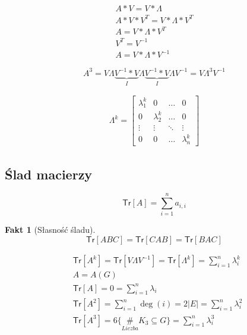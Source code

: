 \documentclass[a4paper,12pt]{article}
\theoremstyle{definition}%
\newtheorem*{fact*}{Fakt} %
\theoremstyle{definition}
\theoremstyle{problem}
\begin{document}
\begin{align*}
A*V=V*\Lambda \\
A*V*V^T=V*\Lambda *V^T\\
A=V*\Lambda *V^T\\
V^T=V^{-1}\\
A= V*\Lambda *V^{-1}
\end{align*}

$$A^3=V\Lambda \underbrace{V^{-1} * V}_I\Lambda \underbrace{V^{-1}* V}_I\Lambda V^{-1} = V\Lambda ^3V^{-1}$$

\begin{align*}
\Lambda ^k= \begin{bmatrix}
\lambda _1^k& 0 & \dots & 0\\
0 & \lambda _2^k & \dots & 0\\
\vdots & \vdots &\ddots & \vdots \\
0 & 0 & \dots & \lambda _n^k
\end{bmatrix}
\end{align*}

\subsection{Ślad macierzy}
$$\mathsf{Tr}[A]=\sum_{i=1}^n a_{i,i}$$
\begin{fact*}[Słasność śladu]
$$\mathsf{Tr}[ABC]=\mathsf{Tr}[CAB]=\mathsf{Tr}[BAC]$$
\end{fact*}
\begin{align*}
&\mathsf{Tr}[A^k]=\mathsf{Tr}[V \Lambda V^{-1}]=\mathsf{Tr}[\Lambda ^k]=\sum_{i=1}^n\lambda_i^k\\
&A=A(G)\\
&\mathsf{Tr}[A]=0=\sum_{i=1}^n\lambda _i\\
&\mathsf{Tr}[A^2]=\sum_{i=1}^n\deg (i)=2|E|=\sum_{i=1}^n\lambda ^2_i\\
&\mathsf{Tr}[A^3]=6 \{\underset{Liczba}{\#} K_3 \subseteq G\}=\sum_{i=1}^n\lambda ^3_i
\end{align*}

\end{document}
